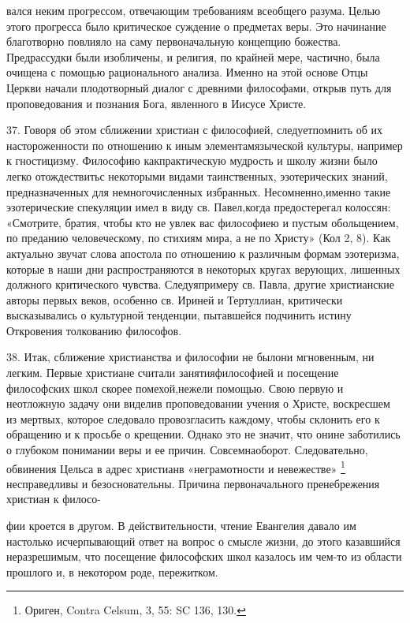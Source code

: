 \documentclass[a5paper,10pt]{article}
\begin{document}
вался неким прогрессом, отвечающим требованиям всеобщего разума. Целью этого
прогресса было критическое суждение о предметах веры. Это начинание благотворно
повлияло на саму первоначальную концепцию божества. Предрассудки были
изобличены, и религия, по крайней мере, частично, была очищена с помощью
рационального анализа. Именно на этой основе Отцы Церкви начали плодотворный
диалог с древними философами, открыв путь для проповедования и познания Бога,
явленного в Иисусе Христе.

37. Говоря об этом сближении христиан с философией, следуетпомнить об их
настороженности по отношению к иным элементамязыческой культуры, например к
гностицизму. Философию какпрактическую мудрость и школу жизни было легко
отождествитьс некоторыми видами таинственных, эзотерических знаний,
предназначенных для немногочисленных избранных. Несомненно,именно такие
эзотерические спекуляции имел в виду св. Павел,когда предостерегал колоссян:
«Смотрите, братия, чтобы кто не увлек вас философиею и пустым обольщением, по
преданию человеческому, по стихиям мира, а не по Христу» (Кол 2, 8). Как
актуально звучат слова апостола по отношению к различным формам эзотеризма,
которые в наши дни распространяются в некоторых кругах верующих, лишенных
должного критического чувства. Следуяпримеру св. Павла, другие христианские
авторы первых веков, особенно св. Ириней и Тертуллиан, критически высказывались
о культурной тенденции, пытавшейся подчинить истину Откровения толкованию
философов.

38. Итак, сближение христианства и философии не былони мгновенным, ни легким.
Первые христиане считали занятияфилософией и посещение философских школ скорее
помехой,нежели помощью. Свою первую и неотложную задачу они виделив
проповедовании учения о Христе, воскресшем из мертвых, которое следовало
провозгласить каждому, чтобы склонить его к обращению и к просьбе о крещении.
Однако это не значит, что онине заботились о глубоком понимании веры и ее
причин. Совсемнаоборот. Следовательно, обвинения Цельса в адрес христианв
«неграмотности и невежестве» \footnote{Ориген, Contra Celsum, 3, 55: SC 136,
130.}  несправедливы и безосновательны. Причина первоначального пренебрежения
христиан к филосо-

фии кроется в другом. В действительности, чтение Евангелия давало им настолько
исчерпывающий ответ на вопрос о смысле жизни, до этого казавшийся неразрешимым,
что посещение философских школ казалось им чем-то из области прошлого и, в
некотором роде, пережитком.
\end{document}
